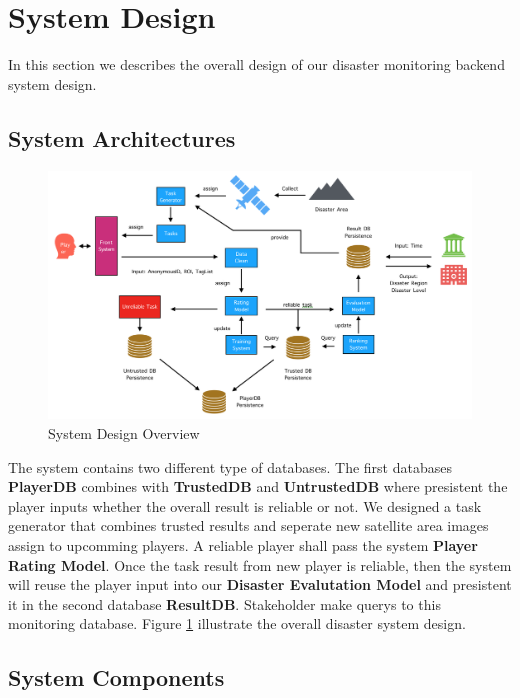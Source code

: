 \section{System Design}

In this section we describes the overall design of our disaster monitoring backend system design.

\subsection{System Architectures}

  \begin{figure}[htp]
  \centering
  \includegraphics[width=\textwidth]{figures/system2}
  \caption{System Design Overview}
  \label{fig:arch}
  \end{figure}

  The system contains two different type of databases. The first databases \textbf{PlayerDB}
  combines with \textbf{TrustedDB} and \textbf{UntrustedDB} where
  presistent the player inputs whether the overall result is reliable or not. 
  We designed a task generator that combines 
  trusted results and seperate new satellite area images assign to upcomming players. 
  A reliable player shall pass the system \textbf{Player Rating Model}. 
  Once the task result from new player is reliable, then the system will
  reuse the player input into our \textbf{Disaster Evalutation Model} and presistent it in the second
  database \textbf{ResultDB}. Stakeholder make querys to this monitoring database. 
  Figure \ref{fig:arch} illustrate the overall disaster system design.

  

\subsection{System Components}

